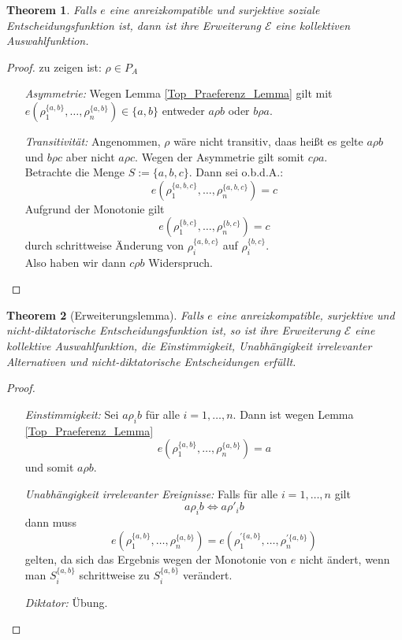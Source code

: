 \documentclass[]{article}
\newtheorem{thm}{Theorem}
\begin{document}
\begin{thm}
	Falls $e$ eine anreizkompatible und surjektive soziale Entscheidungsfunktion ist, dann ist ihre Erweiterung $\mathcal{E}$ eine kollektiven Auswahlfunktion.
\end{thm}
\begin{proof}
	zu zeigen ist: $\rho \in P_A$ \\
	\begin{itemize}
		\item[\it Asymmetrie:] Wegen Lemma \ref{Top_Praeferenz_Lemma} gilt mit $e\left(\rho_1^{\{a, b \}}, \dots, \rho_n^{\{a, b \}} \right) \in \{a,b\}$ entweder $a \rho b$ oder $b \rho a$. 
		\item[\it Transitivität:] Angenommen, $\rho$ wäre nicht transitiv, daas heißt es gelte $a \rho b$ und $b \rho c$ aber nicht $a \rho c$. 
		Wegen der Asymmetrie gilt somit $c \rho a$.\\
		Betrachte die Menge $S := \{a,b,c\}$. Dann sei o.b.d.A.:
		\[ e\left(\rho_1^{\{a, b,c \}}, \dots, \rho_n^{\{a, b, c \}} \right) = c \]
		Aufgrund der Monotonie gilt
		\[  e\left(\rho_1^{\{b, c \}}, \dots, \rho_n^{\{b, c \}} \right) = c \]
		durch schrittweise Änderung von $\rho_i^{\{a,b,c\}}$ auf $\rho_i^{\{b,c\}}$. \\
		Also haben wir dann $c \rho b$ Widerspruch.
	\end{itemize}
\end{proof}

\begin{thm}[Erweiterungslemma]
	Falls $e$ eine anreizkompatible, surjektive und nicht-diktatorische Entscheidungsfunktion ist, so ist ihre Erweiterung $\mathcal{E}$ eine kollektive Auswahlfunktion, die Einstimmigkeit, Unabhängigkeit irrelevanter Alternativen und nicht-diktatorische Entscheidungen erfüllt.
\end{thm}
\begin{proof}~
	\begin{itemize}
		\item[\it Einstimmigkeit:] Sei $a \rho_i b$ für alle $i=1, \dots, n$. Dann ist wegen Lemma \ref{Top_Praeferenz_Lemma} 
		\[e\left(\rho_1^{\{a, b \}}, \dots, \rho_n^{\{a, b \}} \right) = a\] 
		und somit $a \rho b$.
		\item[\it Unabhängigkeit irrelevanter Ereignisse:] Falls für alle $i = 1, \dots, n$ gilt
		\[a \rho_i b \Leftrightarrow a \rho'_i b \]
		dann muss
		\[e\left(\rho_1^{\{a, b \}}, \dots, \rho_n^{\{a, b \}} \right) 
		= 
		e\left(\rho_1^{\prime \{a, b \}}, \dots, \rho_n^{\prime \{a, b \}} \right) \]
		gelten, da sich das Ergebnis wegen der Monotonie von $e$ nicht ändert, wenn man $S_i^{\{a,b\}}$ schrittweise zu $S_i^{\{a,b\}}$ verändert.
		\item[\it Diktator:] Übung.
	\end{itemize}
\end{proof}
\end{document}
